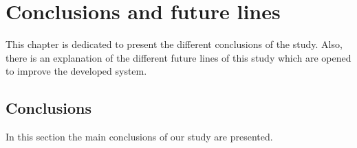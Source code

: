 
\chapter{Conclusions and future lines}

This chapter is dedicated to present the different conclusions of the study. Also, there is an explanation of the different future lines of this study which are opened to improve the developed system.

\section{Conclusions}

In this section the main conclusions of our study are presented. 

